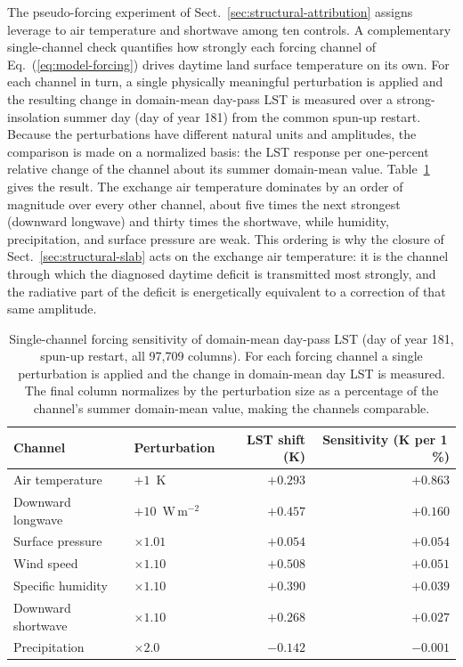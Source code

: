 The pseudo-forcing experiment of Sect.~\ref{sec:structural-attribution}
assigns leverage to air temperature and shortwave among ten controls. A
complementary single-channel check quantifies how strongly each forcing
channel of Eq.~(\ref{eq:model-forcing}) drives daytime land surface
temperature on its own. For each channel in turn, a single physically
meaningful perturbation is applied and the resulting change in domain-mean
day-pass LST is measured over a strong-insolation summer day (day of year
181) from the common spun-up restart. Because the perturbations have
different natural units and amplitudes, the comparison is made on a
normalized basis: the LST response per one-percent relative change of the
channel about its summer domain-mean value. Table~\ref{tab:forcing-sensitivity}
gives the result. The exchange air temperature dominates by an order of
magnitude over every other channel, about five times the next strongest
(downward longwave) and thirty times the shortwave, while humidity,
precipitation, and surface pressure are weak. This ordering is why the
closure of Sect.~\ref{sec:structural-slab} acts on the exchange air
temperature: it is the channel through which the diagnosed daytime deficit
is transmitted most strongly, and the radiative part of the deficit is
energetically equivalent to a correction of that same amplitude.

\begin{table}[t]
\caption{Single-channel forcing sensitivity of domain-mean day-pass LST
(day of year 181, spun-up restart, all 97{,}709 columns). For each forcing
channel a single perturbation is applied and the change in domain-mean day
LST is measured. The final column normalizes by the perturbation size as a
percentage of the channel's summer domain-mean value, making the channels
comparable.}
\label{tab:forcing-sensitivity}
\centering
\small
\begin{tabular}{llrr}
\hline
Channel & Perturbation & LST shift (K) & Sensitivity (K per 1\,\%) \\
\hline
Air temperature & $+1$~K & $+0.293$ & $+0.863$ \\
Downward longwave & $+10$~W\,m$^{-2}$ & $+0.457$ & $+0.160$ \\
Surface pressure & $\times 1.01$ & $+0.054$ & $+0.054$ \\
Wind speed & $\times 1.10$ & $+0.508$ & $+0.051$ \\
Specific humidity & $\times 1.10$ & $+0.390$ & $+0.039$ \\
Downward shortwave & $\times 1.10$ & $+0.268$ & $+0.027$ \\
Precipitation & $\times 2.0$ & $-0.142$ & $-0.001$ \\
\hline
\end{tabular}
\end{table}

